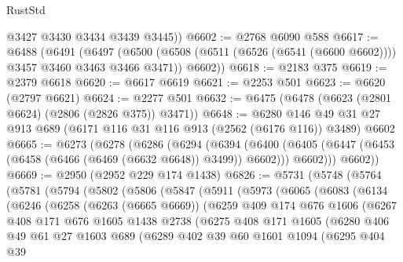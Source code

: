 \begin{lexlean}{RustStd}
\begin{coremodule}
        @3427
        @3430
        @3434
        @3439
        @3445))
@6602 := @2768 @6090 @588
@6617 := @6488
    (@6491
      (@6497
        (@6500 (@6508 (@6511 (@6526 (@6541 (@6600 @6602)))) @3457 @3460 @3463 @3466 @3471))
        @6602))
@6618 := @2183 @375
@6619 := @2379 @6618
@6620 := @6617 @6619
@6621 := @2253 @501
@6623 := @6620 (@2797 @6621)
@6624 := @2277 @501
@6632 := @6475 (@6478 (@6623 (@2801 @6624) (@2806 (@2826 @375)) @3471))
@6648 := @6280
    @146
    @49
    @31
    @27
    @913
    @689
    (@6171 @116 @31 @116 @913 (@2562 (@6176 @116)) @3489)
    @6602
@6665 := @6273
    (@6278
      (@6286
        (@6294
          (@6394
            (@6400
              (@6405 (@6447 (@6453 (@6458 (@6466 (@6469 (@6632 @6648)) @3499)) @6602)))
              @6602)))
        @6602))
@6669 := @2950 (@2952 @229 @174 @1438)
@6826 := @5731
    (@5748
      (@5764
        (@5781
          (@5794
            (@5802
              (@5806
                (@5847
                  (@5911
                    (@5973
                      (@6065
                        (@6083
                          (@6134
                            (@6246
                              (@6258
                                (@6263 (@6665 @6669))
                                (@6259
                                  @409
                                  @174
                                  @676
                                  @1606
                                  (@6267
                                    @408
                                    @171
                                    @676
                                    @1605
                                    @1438
                                    @2738
                                    (@6275
                                      @408
                                      @171
                                      @1605
                                      (@6280
                                        @406
                                        @49
                                        @61
                                        @27
                                        @1603
                                        @689
                                        (@6289
                                          @402
                                          @39
                                          @60
                                          @1601
                                          @1094
                                          (@6295
                                            @404
                                            @39

\end{coremodule}
\end{lexlean}
